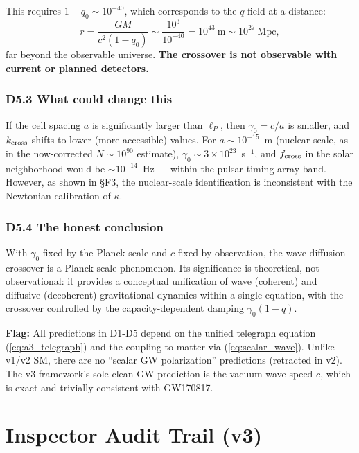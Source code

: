 \documentclass[reprint]{revtex4-2}
\begin{document}
This requires $1-q_0 \sim 10^{-40}$, which corresponds to the $q$-field at a distance:
\begin{equation}
r = \frac{GM}{c^2(1-q_0)} \sim \frac{10^3}{10^{-40}} = 10^{43}~\text{m} \sim 10^{27}~\text{Mpc},
\end{equation}
far beyond the observable universe. \textbf{The crossover is not observable with current or planned detectors.}

\subsubsection{D5.3 What could change this}

If the cell spacing $a$ is significantly larger than $\ell_P$, then $\gamma_0 = c/a$ is smaller, and $k_{\rm cross}$ shifts to lower (more accessible) values. For $a \sim 10^{-15}$~m (nuclear scale, as in the now-corrected $N\sim 10^{90}$ estimate), $\gamma_0 \sim 3\times 10^{23}$~s$^{-1}$, and $f_{\rm cross}$ in the solar neighborhood would be $\sim 10^{-14}$~Hz --- within the pulsar timing array band. However, as shown in \S F3, the nuclear-scale identification is inconsistent with the Newtonian calibration of $\kappa$.

\subsubsection{D5.4 The honest conclusion}

With $\gamma_0$ fixed by the Planck scale and $c$ fixed by observation, the wave-diffusion crossover is a Planck-scale phenomenon. Its significance is theoretical, not observational: it provides a conceptual unification of wave (coherent) and diffusive (decoherent) gravitational dynamics within a single equation, with the crossover controlled by the capacity-dependent damping $\gamma_0(1-q)$.

\textbf{Flag:} All predictions in D1-D5 depend on the unified telegraph equation (\ref{eq:a3_telegraph}) and the coupling to matter via (\ref{eq:scalar_wave}). Unlike v1/v2 SM, there are no ``scalar GW polarization'' predictions (retracted in v2). The v3 framework's sole clean GW prediction is the vacuum wave speed $c$, which is exact and trivially consistent with GW170817.

\section{Inspector Audit Trail (v3)}
\end{document}
